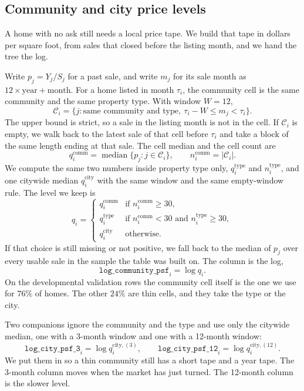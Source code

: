 \documentclass[11pt]{article}
\begin{document}
\subsection{Community and city price levels}
\label{sec:psf}

A home with no ask still needs a local price tape. We build that tape in dollars per square foot, from sales that closed before the listing month, and we hand the tree the log.

Write \(p_j = Y_j / S_j\) for a past sale, and write \(m_j\) for its sale month as \(12\times\text{year} + \text{month}\). For a home listed in month \(\tau_i\), the community cell is the same community and the same property type. With window \(W = 12\),
\[
\mathcal{C}_i = \{ j : \text{same community and type},\ \tau_i - W \le m_j < \tau_i \}.
\]
The upper bound is strict, so a sale in the listing month is not in the cell. If \(\mathcal{C}_i\) is empty, we walk back to the latest sale of that cell before \(\tau_i\) and take a block of the same length ending at that sale. The cell median and the cell count are
\[
q^{\mathrm{comm}}_i = \operatorname{median}\{p_j : j \in \mathcal{C}_i\}, \qquad n^{\mathrm{comm}}_i = |\mathcal{C}_i|.
\]
We compute the same two numbers inside property type only, \(q^{\mathrm{type}}_i\) and \(n^{\mathrm{type}}_i\), and one citywide median \(q^{\mathrm{city}}_i\) with the same window and the same empty-window rule. The level we keep is
\[
q_i =
\begin{cases}
q^{\mathrm{comm}}_i & \text{if } n^{\mathrm{comm}}_i \ge 30,\\
q^{\mathrm{type}}_i & \text{if } n^{\mathrm{comm}}_i < 30 \text{ and } n^{\mathrm{type}}_i \ge 30,\\
q^{\mathrm{city}}_i & \text{otherwise.}
\end{cases}
\]
If that choice is still missing or not positive, we fall back to the median of \(p_j\) over every usable sale in the sample the table was built on. The column is the log,
\[
\texttt{log\_community\_psf}_i = \log q_i.
\]
On the developmental validation rows the community cell itself is the one we use for \(76\%\) of homes. The other \(24\%\) are thin cells, and they take the type or the city.

Two companions ignore the community and the type and use only the citywide median, one with a 3-month window and one with a 12-month window:
\[
\texttt{log\_city\_psf\_3}_i = \log q^{\mathrm{city},(3)}_i, \qquad
\texttt{log\_city\_psf\_12}_i = \log q^{\mathrm{city},(12)}_i.
\]
We put them in so a thin community still has a short tape and a year tape. The 3-month column moves when the market has just turned. The 12-month column is the slower level.
\end{document}
